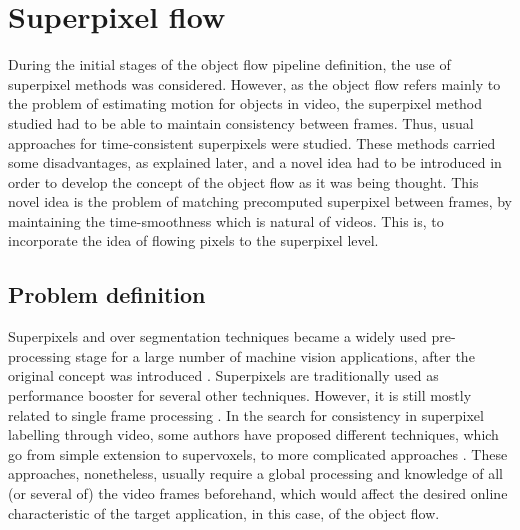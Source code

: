 
\chapter{Superpixel flow} \label{chap:suppix}

During the initial stages of the object flow pipeline definition, the use of superpixel 
methods was considered. However, as the object flow refers mainly to the problem of 
estimating motion for objects in video, the superpixel method studied had to be able to 
maintain consistency between frames. Thus, usual approaches for time-consistent superpixels 
were studied. These methods carried some disadvantages, as explained later, and a novel 
idea had to be introduced in order to develop the concept of the object flow as it 
was being thought. This novel idea is the problem of matching precomputed superpixel 
between frames, by maintaining the time-smoothness which is natural of videos. 
This is, to incorporate the idea of flowing pixels to the superpixel level.

\section{Problem definition}
Superpixels and over segmentation techniques became a widely used pre-processing 
stage for a large number of machine vision applications, after the
original concept was introduced \cite{c1}. Superpixels are traditionally used as 
performance booster for several other techniques. However, it is still mostly related to
single frame processing \cite{c1}\cite{c10}\cite{c11}. In the search for
consistency in superpixel labelling through video, some authors have proposed different 
techniques, which go from simple extension to supervoxels\cite{c9}\cite{c11},
to more complicated approaches \cite{c8}. These approaches, nonetheless, usually require a 
global processing and knowledge of all (or several of) the video frames beforehand, which would 
affect the desired online characteristic of the target application, in this case, of the object flow.

